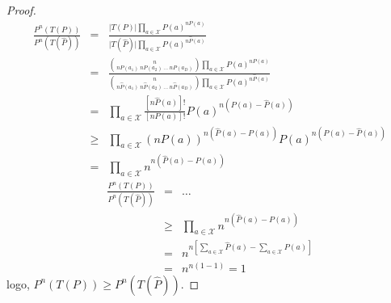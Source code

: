 \begin{frame}[allowframebreaks]
  \begin{proof}
  \vspace{-0.2cm}
  \begin{eqnarray}
  \frac{P^n(T(P))}{P^n(T(\hat{P}))} &=& \frac{\vert T(P) \vert \prod_{a \in \mathcal{X}} P(a)^{nP(a)} }{ \vert T(\hat{P}) \vert \prod_{a \in \mathcal{X}} P(a)^{n\hat{P}(a)}  } \nonumber \\
	&=& \frac{ { n \choose nP(a_1) \ nP(a_2) \ \ldots \ nP(a_D) } \prod_{a \in \mathcal{X}} P(a)^{nP(a)} }{ { n \choose n\hat{P}(a_1) \ n\hat{P}(a_2) \ \ldots \ n\hat{P}(a_D) } \prod_{a \in \mathcal{X}} P(a)^{n\hat{P}(a)}  } \nonumber \\
	&=& \prod_{a \in \mathcal{X}} \frac{ [n\hat{P}(a)]! }{[nP(a)]!} P(a)^{n(P(a)-\hat{P}(a))} \nonumber \\
	&\geq& \prod_{a \in \mathcal{X}} (nP(a))^{n(\hat{P}(a)-P(a))} P(a)^{n(P(a)-\hat{P}(a))} \nonumber \\
	&=& \prod_{a \in \mathcal{X}} n^{n(\hat{P}(a)-P(a))}  
  \end{eqnarray}
  \proofbreak
  \vspace{-2ex}
  \begin{eqnarray}
  \frac{P^n(T(P))}{P^n(T(\hat{P}))} &=& \ldots \nonumber \\
	&\geq& \prod_{a \in \mathcal{X}} n^{n(\hat{P}(a)-P(a))} \nonumber \\
	&=& n^{n\left[ \sum_{a \in \mathcal{X}} \hat{P}(a) - \sum_{a \in \mathcal{X}} P(a) \right]} \nonumber \\
	&=& n^{n(1-1)} = 1
  \end{eqnarray}
  logo, $P^n(T(P)) \geq P^n(T(\hat{P}))$.
  \end{proof}
\end{frame}



